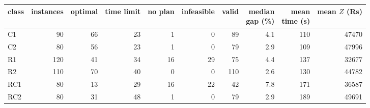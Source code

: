\small
\begin{adjustbox}{max width=\linewidth}
\begin{tabular}{@{}lrrrrrrrrr@{}}
\toprule
class & instances & optimal & time limit & no plan & infeasible & valid & \shortstack{median\\gap (\%)} & \shortstack{mean\\time (s)} & \shortstack{mean $Z$\\(Rs)} \\
\midrule
C1 & 90 & 66 & 23 & 1 & 0 & 89 & 4.1 & 110 & 47470 \\
C2 & 80 & 56 & 23 & 1 & 0 & 79 & 2.9 & 109 & 47996 \\
R1 & 120 & 41 & 34 & 16 & 29 & 75 & 4.4 & 137 & 32677 \\
R2 & 110 & 70 & 40 & 0 & 0 & 110 & 2.6 & 130 & 44782 \\
RC1 & 80 & 13 & 29 & 16 & 22 & 42 & 7.8 & 171 & 36587 \\
RC2 & 80 & 31 & 48 & 1 & 0 & 79 & 2.9 & 189 & 49691 \\
\bottomrule
\end{tabular}
\end{adjustbox}
